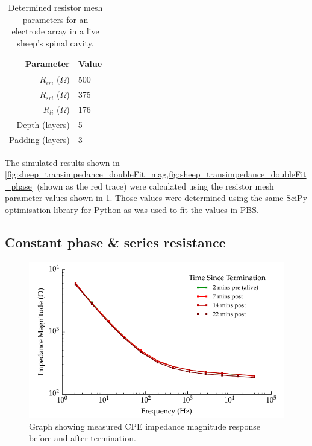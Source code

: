     \begin{table}
      \centering
      \begin{tabular}{r | l}
        Parameter & Value \\
        \hline
        $R_{eri}$ ($\Omega$)& 500\\
        $R_{sri}$ ($\Omega$)& 375\\
        $R_{li}$ ($\Omega$)& 176\\
        Depth (layers) & 5 \\
        Padding (layers) & 3 \\
      \end{tabular}
      \caption{\label{tab:RESparams_sheep} Determined resistor mesh parameters for an electrode array in a live sheep's spinal cavity.}
    \end{table}
    The simulated results shown in \cref{fig:sheep_transimpedance_doubleFit_mag,fig:sheep_transimpedance_doubleFit_phase} (shown as the red trace) were calculated using the resistor mesh parameter values shown in \cref{tab:RESparams_sheep}.
    Those values were determined using the same SciPy optimisation library for Python as was used to fit the values in PBS.


  \subsection{Constant phase \& series resistance}

    \begin{figure}
      \centering
      \includegraphics{content/pt2/08-InterfaceParameters/graphics/graph_Day2_Sheep_CPE_ImpedanceMagnitude}
      \caption{\label{fig:graph_Day2_Sheep_CPE_ImpedanceMagnitude} Graph showing measured CPE impedance magnitude response before and after termination.}
    \end{figure}

